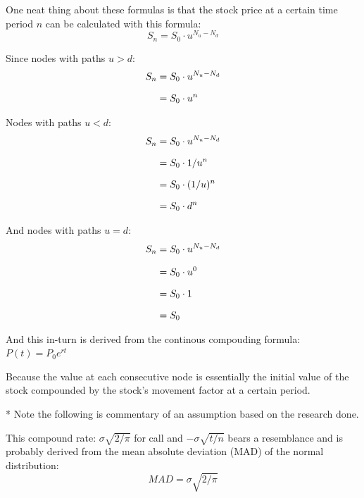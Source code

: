 \documentclass[12pt, letterpaper]{article}
\begin{document}
One neat thing about these formulas is that the stock price at a certain time period ${n}$ can be calculated with this formula:
\begin{equation*}
  {S}_n = {S}_0 \cdot {u}^{N_u-N_d}
\end{equation*}

Since nodes with paths ${u > d}$:
\begin{equation*}
  \setlength{\jot}{10pt}
  \begin{split}
    {S}_n
    & = {S}_0 \cdot {u}^{N_u-N_d}
    \\
    & = {S}_0 \cdot {u}^n
  \end{split}
\end{equation*}

Nodes with paths ${u < d}$:
\begin{equation*}
  \setlength{\jot}{10pt}
  \begin{split}
    {S}_n
    & = {S}_0 \cdot {u}^{N_u-N_d}
    \\
    & = {S}_0 \cdot {1/u^n}
    \\
    & = {S}_0 \cdot ({1/u})^n
    \\
    & = {S}_0 \cdot {d^n}
  \end{split}
\end{equation*}

And nodes with paths ${u = d}$:
\begin{equation*}
  \setlength{\jot}{10pt}
  \begin{split}
    {S}_n
    & = {S}_0 \cdot {u}^{N_u-N_d}
    \\
    & = {S}_0 \cdot {u^0}
    \\
    & = {S}_0 \cdot 1
    \\
    & = {S}_0
  \end{split}
\end{equation*}


And this in-turn is derived from the continous compouding formula: %
${P(t)} = {P}_{0}e^{rt}$

Because the value at each consecutive node is essentially the initial value of the stock compounded by the stock's movement factor at a certain period.

* Note the following is commentary of an assumption based on the research done.

This compound rate: ${\sigma\sqrt{2/\pi}}$ for call and ${-\sigma\sqrt{t/n}}$ bears a resemblance and is probably derived from the mean absolute deviation (MAD) of the normal distribution:
\begin{equation*}
  MAD = \sigma\sqrt{2/\pi}
\end{equation*}
\end{document}
